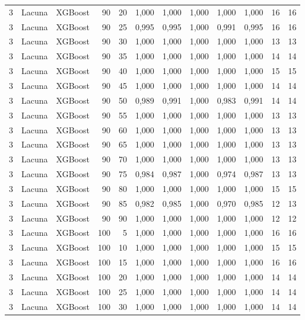 \begin{longtable}{@{}rllrrrrrrrrr@{}}
3 & Lacuna & XGBoost & 90 & 20 & 1,000 & 1,000 & 1,000 & 1,000 & 1,000 & 16 & 16 \\
3 & Lacuna & XGBoost & 90 & 25 & 0,995 & 0,995 & 1,000 & 0,991 & 0,995 & 16 & 16 \\
3 & Lacuna & XGBoost & 90 & 30 & 1,000 & 1,000 & 1,000 & 1,000 & 1,000 & 13 & 13 \\
3 & Lacuna & XGBoost & 90 & 35 & 1,000 & 1,000 & 1,000 & 1,000 & 1,000 & 14 & 14 \\
3 & Lacuna & XGBoost & 90 & 40 & 1,000 & 1,000 & 1,000 & 1,000 & 1,000 & 15 & 15 \\
3 & Lacuna & XGBoost & 90 & 45 & 1,000 & 1,000 & 1,000 & 1,000 & 1,000 & 14 & 14 \\
3 & Lacuna & XGBoost & 90 & 50 & 0,989 & 0,991 & 1,000 & 0,983 & 0,991 & 14 & 14 \\
3 & Lacuna & XGBoost & 90 & 55 & 1,000 & 1,000 & 1,000 & 1,000 & 1,000 & 13 & 13 \\
3 & Lacuna & XGBoost & 90 & 60 & 1,000 & 1,000 & 1,000 & 1,000 & 1,000 & 13 & 13 \\
3 & Lacuna & XGBoost & 90 & 65 & 1,000 & 1,000 & 1,000 & 1,000 & 1,000 & 13 & 13 \\
3 & Lacuna & XGBoost & 90 & 70 & 1,000 & 1,000 & 1,000 & 1,000 & 1,000 & 13 & 13 \\
3 & Lacuna & XGBoost & 90 & 75 & 0,984 & 0,987 & 1,000 & 0,974 & 0,987 & 13 & 13 \\
3 & Lacuna & XGBoost & 90 & 80 & 1,000 & 1,000 & 1,000 & 1,000 & 1,000 & 15 & 15 \\
3 & Lacuna & XGBoost & 90 & 85 & 0,982 & 0,985 & 1,000 & 0,970 & 0,985 & 12 & 13 \\
3 & Lacuna & XGBoost & 90 & 90 & 1,000 & 1,000 & 1,000 & 1,000 & 1,000 & 12 & 12 \\
3 & Lacuna & XGBoost & 100 & 5 & 1,000 & 1,000 & 1,000 & 1,000 & 1,000 & 16 & 16 \\
3 & Lacuna & XGBoost & 100 & 10 & 1,000 & 1,000 & 1,000 & 1,000 & 1,000 & 15 & 15 \\
3 & Lacuna & XGBoost & 100 & 15 & 1,000 & 1,000 & 1,000 & 1,000 & 1,000 & 16 & 16 \\
3 & Lacuna & XGBoost & 100 & 20 & 1,000 & 1,000 & 1,000 & 1,000 & 1,000 & 14 & 14 \\
3 & Lacuna & XGBoost & 100 & 25 & 1,000 & 1,000 & 1,000 & 1,000 & 1,000 & 14 & 14 \\
3 & Lacuna & XGBoost & 100 & 30 & 1,000 & 1,000 & 1,000 & 1,000 & 1,000 & 14 & 14 \\

\end{longtable}
